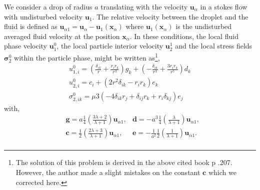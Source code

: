 We consider a drop of radius $a$ translating with the velocity $\textbf{u}_\alpha$ in a stokes flow with undisturbed velocity $\textbf{u}_1$.
The relative velocity between the droplet and the fluid is defined as $\textbf{u}_{\alpha 1}= \textbf{u}_\alpha - \textbf{u}_1(\textbf{x}_\alpha)$ where $\textbf{u}_1(\textbf{x}_\alpha)$ is the undisturbed averaged fluid velocity at the position $\textbf{x}_\alpha$. 
In these conditions, the local fluid phase velocity $\textbf{u}_1^0$, the local particle interior velocity $\textbf{u}_2^1$ and the local stress fields $\bm\sigma_2^0$ within the particle phase, might be written as\citet{pozrikidis1992boundary}\footnote{The solution of this problem is derived in the above cited book p .207.  However, the author made a slight mistakes on the constant $\textbf{c}$ which we corrected here. }, 
\begin{align*}
    u_{1,i}^0
    = \left(\frac{\delta_{ik}}{r} + \frac{r_ir_k}{r^3}\right)  g_k
    + \left(-\frac{\delta_{ik}}{r^3} + \frac{3r_ir_k}{r^5}\right)  d_k\\
    u_{2,i}^0
    = c_i
    + \left(2 r^2 \delta_{ik} - r_ir_k\right) e_k\\
    \sigma_{2,ik}^0
    = \mu 3(
        - 4 \delta_{ik} r_j
        + \delta_{ij} r_k
        + r_i \delta_{kj}
    )e_j 
\end{align*}
with, 
\begin{align*}
    &\textbf{g} = a\frac{1}{4}\left(\frac{3\lambda + 2}{\lambda +1}\right) \textbf{u}_{\alpha 1},
    &\textbf{d} = -a^3\frac{1}{4}\left(\frac{\lambda}{\lambda +1}\right) \textbf{u}_{\alpha 1},\\
    &\textbf{c} = \frac{1}{2}\left(\frac{2\lambda + 3}{\lambda +1}\right) \textbf{u}_{\alpha 1},
    &\textbf{e} = -\frac{1}{a^2}\frac{1}{2}\left(\frac{1}{\lambda +1}\right)  \textbf{u}_{\alpha 1}.\\
\end{align*}

